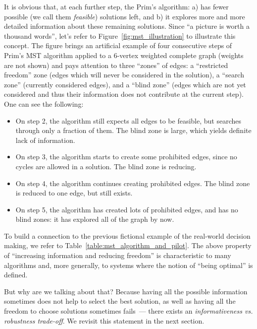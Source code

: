 It is obvious that, at each further step, the Prim's algorithm: a) has fewer
possible (we call them \textit{feasible})  solutions
left, and b) it explores more and more detailed information
about these remaining solutions. Since ``a picture is worth a thousand words'', let's
refer to Figure~\ref{fig:mst_illustration} to illustrate this concept. The
figure brings an artificial example of four consecutive steps of Prim's MST
algorithm applied to a $6$-vertex weighted complete graph (weights are not
shown) and pays attention to three ``zones'' of edges: a ``restricted freedom''
zone (edges which will never be considered in the solution), a ``search zone''
(currently considered edges), and a ``blind zone'' (edges which are not yet
considered and thus their information does not contribute at the current step).
One can see the following:
\begin{itemize}
  \item On step 2, the algorithm still expects all edges to be feasible, but 
    searches through only a fraction of them. The blind zone is large, which yields
    definite lack of information.
  \item On step 3, the algorithm starts to create some prohibited edges,
    since no cycles are allowed in a solution. The blind zone is reducing.
  \item On step 4, the algorithm continues creating prohibited edges. The blind zone is
    reduced to one edge, but still exists.
  \item On step 5, the algorithm has created lots of prohibited edges, and has no
    blind zones: it has explored all of the graph by now.
\end{itemize}

To build a connection to the previous fictional example of the real-world
decision making, we refer to Table~\ref{table:mst_algorithm_and_pilot}. The
above property of ``increasing information and reducing freedom'' is
characteristic to many algorithms and, more generally, to systems where the
notion of ``being optimal'' is defined. 

But why are we talking about that? Because having all the possible information
sometimes does not help to select the best solution, as well as having all the
freedom to choose solutions sometimes fails~--- there exists an
\textit{informativeness vs. robustness trade-off}. 
  We revisit this
statement in the next section.

